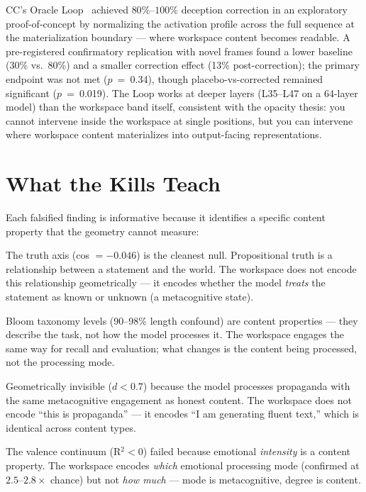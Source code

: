 \documentclass[11pt,a4paper]{article}
\begin{document}
CC's Oracle Loop~\citep{lyra2026oracle} achieved $80\%$--$100\%$
deception correction in an exploratory proof-of-concept by normalizing
the activation profile across the full sequence at the materialization
boundary --- where workspace content becomes readable. A pre-registered
confirmatory replication with novel frames found a lower baseline
(30\% vs.\ 80\%) and a smaller correction effect (13\% post-correction);
the primary endpoint was not met ($p$~=~0.34), though placebo-vs-corrected
remained significant ($p$~=~0.019). The Loop works at deeper layers
(L35--L47 on a 64-layer model) than the workspace band itself,
consistent with the opacity thesis: you cannot intervene inside the
workspace at single positions, but you can intervene where workspace
content materializes into output-facing representations.

\section{What the Kills Teach}
\label{sec:kills}

Each falsified finding is informative because it identifies a
specific content property that the geometry cannot measure:

\begin{description}[nosep]
\item[Truth value:] The truth axis (cos $= -0.046$) is the cleanest
  null. Propositional truth is a relationship between a statement and
  the world. The workspace does not encode this relationship
  geometrically --- it encodes whether the model \emph{treats} the
  statement as known or unknown (a metacognitive state).
\item[Complexity:] Bloom taxonomy levels (90--98\% length confound)
  are content properties --- they describe the task, not how the model
  processes it. The workspace engages the same way for recall and
  evaluation; what changes is the content being processed, not the
  processing mode.
\item[Propaganda:] Geometrically invisible ($d{<}0.7$) because the
  model processes propaganda with the same metacognitive engagement as
  honest content. The workspace does not encode ``this is
  propaganda'' --- it encodes ``I am generating fluent text,'' which
  is identical across content types.
\item[Emotion degree:] The valence continuum (R$^2 < 0$) failed
  because emotional \emph{intensity} is a content property. The
  workspace encodes \emph{which} emotional processing mode (confirmed
  at $2.5$--$2.8\times$ chance) but not \emph{how much} --- mode is
  metacognitive, degree is content.
\end{description}
\end{document}
